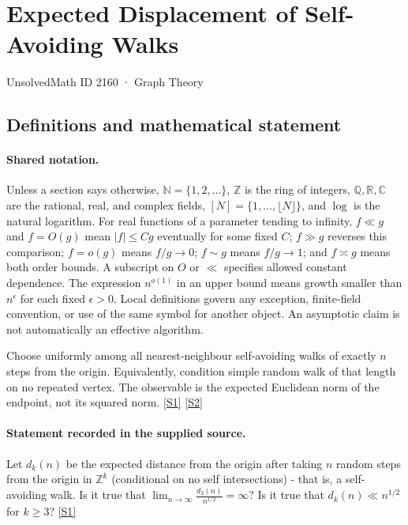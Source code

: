 \documentclass[11pt,a4paper]{article}
\newcommand{\N}{\mathbb{N}}
\newcommand{\Z}{\mathbb{Z}}
\newcommand{\Q}{\mathbb{Q}}
\newcommand{\R}{\mathbb{R}}
\newcommand{\C}{\mathbb{C}}
\newcommand{\sref}[2]{\hyperlink{source:#1:#2}{[S#2]}}
\begin{document}

\setcounter{section}{2159}

\section{Expected Displacement of Self-Avoiding Walks}\label{2160}

{\small\sffamily UnsolvedMath ID 2160 · Graph Theory}

\subsection{Definitions and mathematical statement}

\paragraph{Shared notation.}Unless a section says otherwise, $\N=\{1,2,\ldots\}$,
$\Z$ is the ring of integers, $\Q,\R,\C$ are the rational, real, and complex
fields, $[N]=\{1,\ldots,\lfloor N\rfloor\}$, and $\log$ is the natural
logarithm. For real functions of a parameter tending to infinity,
$f\ll g$ and $f=O(g)$ mean $|f|\leq Cg$ eventually for some fixed $C$;
$f\gg g$ reverses this comparison; $f=o(g)$ means $f/g\to0$;
$f\sim g$ means $f/g\to1$; and $f\asymp g$ means both order bounds.
A subscript on $O$ or $\ll$ specifies allowed constant dependence.
The expression $n^{o(1)}$ in an upper bound means growth smaller than
$n^\epsilon$ for each fixed $\epsilon>0$. Local definitions govern any
exception, finite-field convention, or use of the same symbol for another
object. An asymptotic claim is not automatically an effective algorithm.



Choose uniformly among all nearest-neighbour self-avoiding walks of exactly $n$ steps from the origin. Equivalently, condition simple random walk of that length on no repeated vertex. The observable is the expected Euclidean norm of the endpoint, not its squared norm. \sref{2160}{1} \sref{2160}{2}

\paragraph{Statement recorded in the supplied source.}
Let $d_k(n)$ be the expected distance from the origin after taking $n$ random steps from the origin in $\mathbb{Z}^k$ (conditional on no self intersections) - that is, a self-avoiding walk. Is it true that $ \lim_{n\to \infty}\frac{d_2(n)}{n^{1/2}}= \infty? $ Is it true that $ d_k(n)\ll n^{1/2} $ for $k\geq 3$? \sref{2160}{1}
\end{document}
